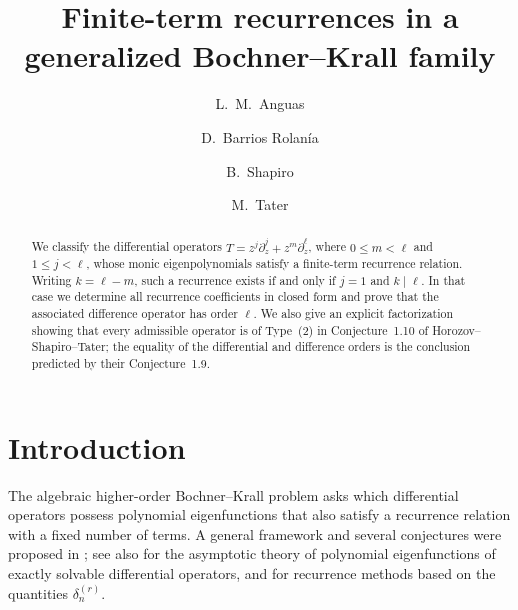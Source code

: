 \documentclass{amsart}
\theoremstyle{definition}
\begin{document}
\title[Finite-term recurrences in a Bochner--Krall family]
{Finite-term recurrences in a generalized Bochner--Krall family}

\author[L.~M.~Anguas]{L.~M.~Anguas}
\address{Saint Louis University, Madrid Campus, Avenida del Valle 34, 28003 Madrid, Spain}

\author[D.~Barrios Rolan\'ia]{D.~Barrios Rolan\'ia}
\address{ETSI Industriales, Universidad Polit\'ecnica de Madrid,
C/Jos\'e Guti\'errez Abascal 2, 28006 Madrid, Spain}

\author[B.~Shapiro]{B.~Shapiro}
\address{Department of Mathematics, Stockholm University, SE-106 91, Stockholm, Sweden}

\author[M.~Tater]{M.~Tater}
\address{Department of Theoretical Physics, Nuclear Physics Institute,
Academy of Sciences, 250\,68 \v{R}e\v{z} near Prague, Czech Republic}



\begin{abstract}
We classify the differential operators
\(T=z^j\partial_z^j+z^m\partial_z^\ell\), where
\(0\le m<\ell\) and \(1\le j<\ell\), whose monic eigenpolynomials satisfy a
finite-term recurrence relation.
Writing \(k=\ell-m\), such a recurrence exists if and only if \(j=1\) and
\(k\mid\ell\).  In that case we determine all recurrence coefficients in
closed form and prove that the associated difference operator has order
\(\ell\).  We also give an explicit factorization showing that every
admissible operator is of Type~(2) in Conjecture~1.10 of
Horozov--Shapiro--Tater; the equality of the differential and difference
orders is the conclusion predicted by their Conjecture~1.9.
\end{abstract}

\maketitle

\section{Introduction}

The algebraic higher-order Bochner--Krall problem asks which differential
operators possess polynomial eigenfunctions that also satisfy a recurrence
relation with a fixed number of terms.  A general framework and several
conjectures were proposed in \cite{HoShTa}; see also \cite{Be} for the
asymptotic theory of polynomial eigenfunctions of exactly solvable
differential operators, and \cite{Segundo} for recurrence methods based on
the quantities \(\delta_n^{(r)}\).
\end{document}
